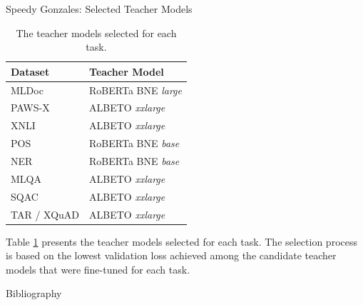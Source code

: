 \documentclass[aspectratio=169,xcolor=dvipsnames]{beamer}
\begin{document}
\begin{frame}{Speedy Gonzales: Selected Teacher Models}

\begin{table}[]
\begin{center}
\begin{tabular}{ll}
\hline
\textbf{Dataset} & \textbf{Teacher Model} \\ \hline
MLDoc            & RoBERTa BNE \textit{large}      \\
PAWS-X           & ALBETO \textit{xxlarge}         \\
XNLI             & ALBETO \textit{xxlarge}         \\
POS              & RoBERTa BNE \textit{base}       \\
NER              & RoBERTa BNE \textit{base}       \\
MLQA             & ALBETO \textit{xxlarge}         \\
SQAC             & ALBETO \textit{xxlarge}         \\
TAR / XQuAD      & ALBETO \textit{xxlarge}        \\ \hline
\end{tabular}
\end{center}
\caption{The teacher models selected for each task.}
\label{table:selected-teacher-models}
\end{table}

Table \ref{table:selected-teacher-models} presents the teacher models selected for each task. The selection process is based on the lowest validation loss achieved among the candidate teacher models that were fine-tuned for each task.

\end{frame}






\begin{frame}[t, allowframebreaks]{Bibliography}


\end{frame}

\begin{frame}
    \titlepage
\end{frame}

\end{document}

